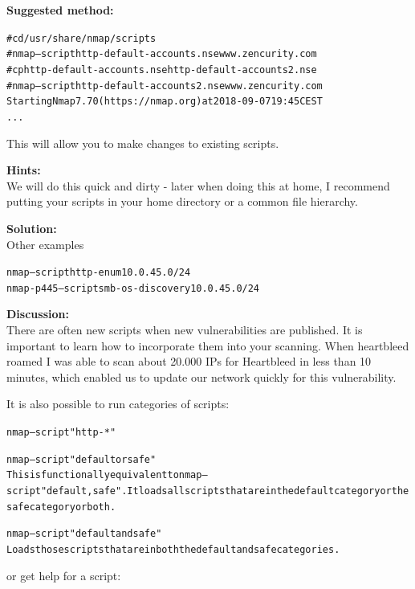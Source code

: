 \documentclass[a4paper,11pt,notitlepage]{report}
\begin{document}
{\bf Suggested method:}\\
\begin{alltt}
# cd /usr/share/nmap/scripts
# nmap --script http-default-accounts.nse www.zencurity.com
# cp http-default-accounts.nse http-default-accounts2.nse
# nmap --script http-default-accounts2.nse www.zencurity.com
Starting Nmap 7.70 ( https://nmap.org ) at 2018-09-07 19:45 CEST
...
\end{alltt}

This will allow you to make changes to existing scripts.

{\bf Hints:} \\
We will do this quick and dirty - later when doing this at home, I recommend putting your scripts in your home directory or a common file hierarchy.

{\bf Solution:}\\
Other examples
\begin{alltt}
nmap --script http-enum 10.0.45.0/24
nmap -p 445 --script smb-os-discovery 10.0.45.0/24
\end{alltt}


{\bf Discussion:}\\
There are often new scripts when new vulnerabilities are published. It is important to learn how to incorporate them into your scanning. When heartbleed roamed I was able to scan about 20.000 IPs for Heartbleed in less than 10 minutes, which enabled us to update our network quickly for this vulnerability.

It is also possible to run categories of scripts:

\begin{alltt}
nmap --script "http-*"

		   nmap --script "default or safe"
			   This is functionally equivalent to nmap --script "default,safe". It loads all scripts that are in the default category or the safe category or both.

		   nmap --script "default and safe"
			   Loads those scripts that are in both the default and safe categories.
\end{alltt}

or get help for a script:
\end{document}
